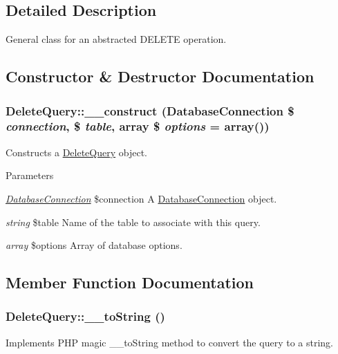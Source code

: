 \subsection{Detailed Description}
General class for an abstracted DELETE operation. 

\subsection{Constructor \& Destructor Documentation}
\hypertarget{classDeleteQuery_af2d5db5f72fff4100b0a1b175fd33e80}{
\subsubsection[{\_\-\_\-construct}]{\setlength{\rightskip}{0pt plus 5cm}DeleteQuery::\_\-\_\-construct ({\bf DatabaseConnection} \$ {\em connection}, \/  \$ {\em table}, \/  array \$ {\em options} = {\ttfamily array()})}}
\label{classDeleteQuery_af2d5db5f72fff4100b0a1b175fd33e80}
Constructs a \hyperlink{classDeleteQuery}{DeleteQuery} object.


\begin{DoxyParams}{Parameters}
\item[{\em \hyperlink{classDatabaseConnection}{DatabaseConnection}}]\$connection A \hyperlink{classDatabaseConnection}{DatabaseConnection} object. \item[{\em string}]\$table Name of the table to associate with this query. \item[{\em array}]\$options Array of database options. \end{DoxyParams}


\subsection{Member Function Documentation}
\hypertarget{classDeleteQuery_a50b6319c4ee1f22b5a055d4ee2f910dc}{
\subsubsection[{\_\-\_\-toString}]{\setlength{\rightskip}{0pt plus 5cm}DeleteQuery::\_\-\_\-toString ()}}
\label{classDeleteQuery_a50b6319c4ee1f22b5a055d4ee2f910dc}
Implements PHP magic \_\-\_\-toString method to convert the query to a string.

